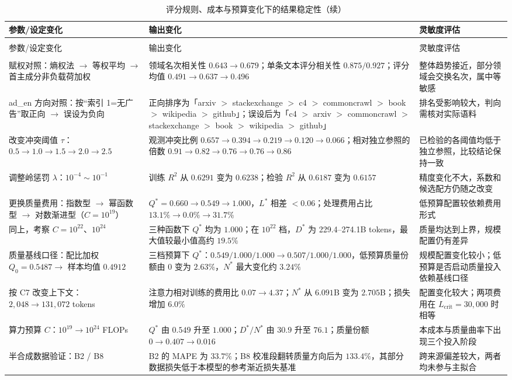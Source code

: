 \begin{longtable}{@{}>{\raggedright\arraybackslash}p{}>{\raggedright\arraybackslash}p{}>{\raggedright\arraybackslash}p{}@{}}
\caption{评分规则、成本与预算变化下的结果稳定性}\label{tab:sensitivity} \\
\toprule
参数/设定变化 & 输出变化 & 灵敏度评估 \\
\midrule
\endfirsthead
\caption[]{评分规则、成本与预算变化下的结果稳定性（续）} \\
\toprule
参数/设定变化 & 输出变化 & 灵敏度评估 \\
\midrule
\endhead
\midrule
\multicolumn{3}{r}{续下页} \\
\endfoot
\bottomrule
\endlastfoot
赋权对照：熵权法 $\to$ 等权平均 $\to$ 首主成分非负载荷加权 & 领域名次相关性 $0.643\to0.679$；单条文本评分相关性 $0.875/0.927$；评分均值 $0.491\to0.637\to0.496$ & 整体趋势接近，部分领域会交换名次，属中等敏感 \\
  ad\_en 方向对照：按“索引 1=无广告”取正向 $\to$ 误设为负向 & 正向排序为「arxiv $>$ stackexchange $>$ c4 $>$ commoncrawl $>$ book $>$ wikipedia $>$ github」；误设后为「c4 $>$ arxiv $>$ commoncrawl $>$ stackexchange $>$ book $>$ wikipedia $>$ github」 & 排名受影响较大，判向需核对实际语料 \\
  改变冲突阈值 $\tau$：$0.5\to1.0\to1.5\to2.0\to2.5$ & 观测冲突比例 $0.657\to0.394\to0.219\to0.120\to0.066$；相对独立参照的倍数 $0.91\to0.82\to0.76\to0.76\to0.86$ & 已检验的各阈值均低于独立参照，比较结论保持一致 \\
  调整岭惩罚 $\lambda$：$10^{-4}\sim10^{-1}$ & 训练 $R^2$ 从 $0.6291$ 变为 $0.6238$；检验 $R^2$ 从 $0.6187$ 变为 $0.6157$ & 精度变化不大，系数和候选配方仍随之改变 \\
  更换质量费用：指数型 $\to$ 幂函数型 $\to$ 对数渐进型（$C=10^{19}$） & $Q^{*}=0.660\to0.549\to1.000$，$L^{*}$ 相差 $<0.06$；处理费用占比 $13.1\%\to0.0\%\to31.7\%$ & 低预算配置较依赖费用形式 \\
  同上，考察 $C=10^{22}$、$10^{24}$ & 三种函数下 $Q^{*}$ 均为 $1.000$；在 $10^{22}$ 档，$D^{*}$ 为 229.4--274.1B tokens，最大值较最小值高约 $19.5\%$ & 质量均达到上界，规模配置仍有差异 \\
  质量基线口径：配比加权 $Q_0=0.5487\to$ 样本均值 $0.4912$ & 三档预算下 $Q^{*}$：$0.549/1.000/1.000\to0.507/1.000/1.000$，低预算质量份额由 $0$ 变为 $2.63\%$，$N^{*}$ 最大变化约 $3.24\%$ & 规模配置变化较小；低预算是否启动质量投入依赖基线口径 \\
  按 C7 改变上下文：$2{,}048\to131{,}072$ tokens & 注意力相对训练的费用比 $0.07\to4.37$；$N^{*}$ 从 $6.091$B 变为 $2.705$B；损失增加 $6.0\%$ & 配置变化较大；两项费用在 $L_{\text{crit}}=30{,}000$ 时相等 \\
  算力预算 $C$：$10^{19}\to10^{24}$ FLOPs & $Q^{*}$ 由 $0.549$ 升至 $1.000$；$D^*/N^*$ 由 $30.9$ 升至 $76.1$；质量份额 $0\to0.407\to0.016$ & 本成本与质量曲率下出现三个投入阶段 \\
  半合成数据验证：B2 / B8 & B2 的 MAPE 为 $33.7\%$；B8 校准段翻转质量方向后为 $133.4\%$，其部分数据损失低于本模型的参考渐近损失基准 & 跨来源偏差较大，两者均未参与主拟合 \\
\end{longtable}

